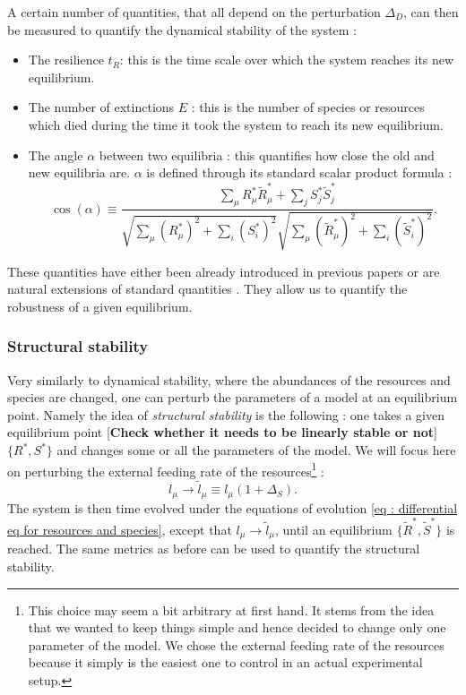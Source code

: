 \documentclass[12pt]{report}
\begin{document}
A certain number of quantities, that all depend on the perturbation $\Delta_D$, can then be measured to quantify the dynamical stability of the system :
\begin{itemize}
  \item The resilience $t_R$: this is the time scale over which the system reaches its new equilibrium.
  \item The number of extinctions $E$ : this is the number of species or resources which died during the time it took the system to reach its new equilibrium.
  \item The angle $\alpha$ between two equilibria : this quantifies how close the old and new equilibria are. $\alpha$ is defined through its standard scalar product formula :
  \begin{equation}
  \cos(\alpha) \equiv \frac{\sum_\mu R^*_\mu \tilde{R}^*_\mu + \sum_j S^*_j\tilde{S}^*_j}{\sqrt{\sum_\mu \left(R^*_\mu\right)^2 + \sum_i \left(S^*_i\right)^2}\sqrt{\sum_\mu \left(\tilde{R}^*_\mu\right)^2 + \sum_i \left(\tilde{S}^*_i\right)^2}}.
  \end{equation}
\end{itemize}
These quantities have either been already introduced in previous papers or are natural extensions of standard quantities \cite{ives_stability_2007,pascual-garcia_mutualism_2017}. They allow us to quantify the robustness of a given equilibrium.

\subsubsection{Structural stability}
Very similarly to dynamical stability, where the abundances of the resources and species are changed, one can perturb the parameters of a model at an equilibrium point. Namely the idea of \textit{structural stability} is the following : one takes a given equilibrium point [\textbf{Check whether it needs to be linearly stable or not}] $\{R^*, S^*\}$ and changes some or all the parameters of the model. We will focus here on perturbing the external feeding rate of the resources\footnote{This choice may seem a bit arbitrary at first hand. It stems from the idea that we wanted to keep things simple and hence decided to change only one parameter of the model. We chose the external feeding rate of the resources because it simply is the easiest one to control in an actual experimental setup.} :
\begin{equation}
l_\mu \rightarrow \tilde{l}_\mu \equiv l_\mu \left(1+\Delta_S\right).
\end{equation}
The system is then time evolved under the equations of evolution \eqref{eq : differential eq for resources and species}, except that $l_\mu \rightarrow \tilde{l}_\mu$, until an equilibrium $\{\tilde{R}^{*}, \tilde{S}^{*}\}$ is reached. The same metrics as before can be used to quantify the structural stability.
\end{document}
